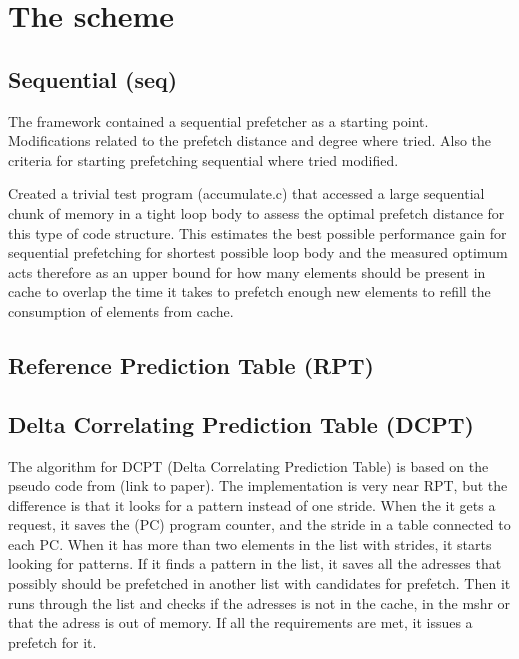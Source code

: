 \chapter{The scheme}

\section{Sequential (seq)}
The framework contained a sequential prefetcher as a starting point.
Modifications related to the prefetch distance and degree where tried.
Also the criteria for starting prefetching sequential where tried modified.


Created a trivial test program (accumulate.c) that accessed a large sequential
chunk of memory in a tight loop body to assess the optimal prefetch distance
for this type of code structure. This estimates the best possible performance
gain for sequential prefetching for shortest possible loop body and the
measured optimum acts therefore as an upper bound for how many elements should
be present in cache to overlap the time it takes to prefetch enough new
elements to refill the consumption of elements from cache.

\section{Reference Prediction Table (RPT)}

\section{Delta Correlating Prediction Table (DCPT)}
The algorithm for DCPT (Delta Correlating Prediction Table) is based on the pseudo code from (link to paper).
The implementation is very near RPT, but the difference is that it looks for a pattern instead of one stride.
When the it gets a request, it saves the (PC) program counter, and the stride in a table connected to each PC. When it has more than two elements in the list with strides, it starts looking for patterns.
If it finds a pattern in the list, it saves all the adresses that possibly should be prefetched in another list with candidates for prefetch.
Then it runs through the list and checks if the adresses is not in the cache, in the mshr or that the adress is out of memory. If all the requirements are met, it issues a prefetch for it.
